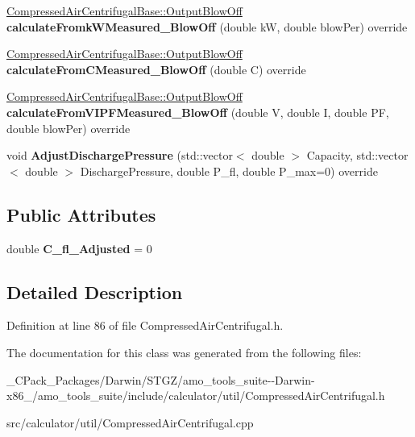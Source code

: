 \begin{DoxyCompactItemize}
\hyperlink{struct_compressed_air_centrifugal_base_1_1_output_blow_off}{Compressed\+Air\+Centrifugal\+Base\+::\+Output\+Blow\+Off} {\bfseries calculate\+Fromk\+W\+Measured\+\_\+\+Blow\+Off} (double kW, double blow\+Per) override
\item 
\mbox{\label{class_compressed_air_centrifugal___blow_off_a3025676e9f8fbb1425316313517203fb}} 
\hyperlink{struct_compressed_air_centrifugal_base_1_1_output_blow_off}{Compressed\+Air\+Centrifugal\+Base\+::\+Output\+Blow\+Off} {\bfseries calculate\+From\+C\+Measured\+\_\+\+Blow\+Off} (double C) override
\item 
\mbox{\label{class_compressed_air_centrifugal___blow_off_afc4530f116e145fa5c09cd434211dba5}} 
\hyperlink{struct_compressed_air_centrifugal_base_1_1_output_blow_off}{Compressed\+Air\+Centrifugal\+Base\+::\+Output\+Blow\+Off} {\bfseries calculate\+From\+V\+I\+P\+F\+Measured\+\_\+\+Blow\+Off} (double V, double I, double PF, double blow\+Per) override
\item 
\mbox{\label{class_compressed_air_centrifugal___blow_off_acfb335ebe27d1108346f781084c1204b}} 
void {\bfseries Adjust\+Discharge\+Pressure} (std\+::vector$<$ double $>$ Capacity, std\+::vector$<$ double $>$ Discharge\+Pressure, double P\+\_\+fl, double P\+\_\+max=0) override
\end{DoxyCompactItemize}
\subsection*{Public Attributes}
\begin{DoxyCompactItemize}
\item 
\mbox{\label{class_compressed_air_centrifugal___blow_off_acd9d25aecfc2f84cf82959c8175914bc}} 
double {\bfseries C\+\_\+fl\+\_\+\+Adjusted} = 0
\end{DoxyCompactItemize}


\subsection{Detailed Description}


Definition at line 86 of file Compressed\+Air\+Centrifugal.\+h.



The documentation for this class was generated from the following files\+:\begin{DoxyCompactItemize}
\item 
\+\_\+\+C\+Pack\+\_\+\+Packages/\+Darwin/\+S\+T\+G\+Z/amo\+\_\+tools\+\_\+suite-\/-\/\+Darwin-\/x86\+\_/amo\+\_\+tools\+\_\+suite/include/calculator/util/Compressed\+Air\+Centrifugal.\+h\item 
src/calculator/util/Compressed\+Air\+Centrifugal.\+cpp\end{DoxyCompactItemize}
